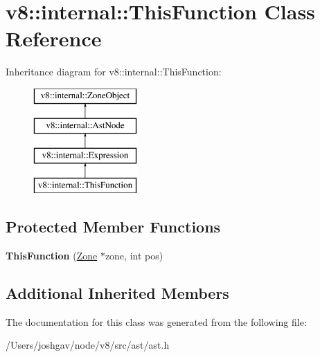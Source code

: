 \hypertarget{classv8_1_1internal_1_1_this_function}{}\section{v8\+:\+:internal\+:\+:This\+Function Class Reference}
\label{classv8_1_1internal_1_1_this_function}
Inheritance diagram for v8\+:\+:internal\+:\+:This\+Function\+:\begin{figure}[H]
\begin{center}
\leavevmode
\includegraphics[height=4.000000cm]{classv8_1_1internal_1_1_this_function}
\end{center}
\end{figure}
\subsection*{Protected Member Functions}
\begin{DoxyCompactItemize}
\item 
{\bfseries This\+Function} (\hyperlink{classv8_1_1internal_1_1_zone}{Zone} $\ast$zone, int pos)\hypertarget{classv8_1_1internal_1_1_this_function_a58f6bc463e554b8f121dcd5f4c454a6f}{}\label{classv8_1_1internal_1_1_this_function_a58f6bc463e554b8f121dcd5f4c454a6f}

\end{DoxyCompactItemize}
\subsection*{Additional Inherited Members}


The documentation for this class was generated from the following file\+:\begin{DoxyCompactItemize}
\item 
/\+Users/joshgav/node/v8/src/ast/ast.\+h\end{DoxyCompactItemize}
